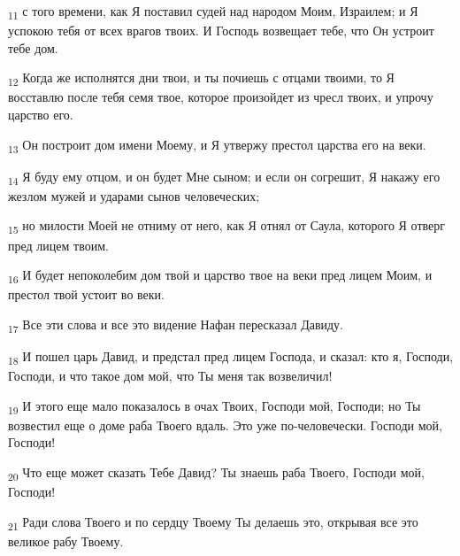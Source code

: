 \begin{tcolorbox}
\textsubscript{11} с того времени, как Я поставил судей над народом Моим, Израилем; и Я успокою тебя от всех врагов твоих. И Господь возвещает тебе, что Он устроит тебе дом.
\end{tcolorbox}
\begin{tcolorbox}
\textsubscript{12} Когда же исполнятся дни твои, и ты почиешь с отцами твоими, то Я восставлю после тебя семя твое, которое произойдет из чресл твоих, и упрочу царство его.
\end{tcolorbox}
\begin{tcolorbox}
\textsubscript{13} Он построит дом имени Моему, и Я утвержу престол царства его на веки.
\end{tcolorbox}
\begin{tcolorbox}
\textsubscript{14} Я буду ему отцом, и он будет Мне сыном; и если он согрешит, Я накажу его жезлом мужей и ударами сынов человеческих;
\end{tcolorbox}
\begin{tcolorbox}
\textsubscript{15} но милости Моей не отниму от него, как Я отнял от Саула, которого Я отверг пред лицем твоим.
\end{tcolorbox}
\begin{tcolorbox}
\textsubscript{16} И будет непоколебим дом твой и царство твое на веки пред лицем Моим, и престол твой устоит во веки.
\end{tcolorbox}
\begin{tcolorbox}
\textsubscript{17} Все эти слова и все это видение Нафан пересказал Давиду.
\end{tcolorbox}
\begin{tcolorbox}
\textsubscript{18} И пошел царь Давид, и предстал пред лицем Господа, и сказал: кто я, Господи, Господи, и что такое дом мой, что Ты меня так возвеличил!
\end{tcolorbox}
\begin{tcolorbox}
\textsubscript{19} И этого еще мало показалось в очах Твоих, Господи мой, Господи; но Ты возвестил еще о доме раба Твоего вдаль. Это уже по-человечески. Господи мой, Господи!
\end{tcolorbox}
\begin{tcolorbox}
\textsubscript{20} Что еще может сказать Тебе Давид? Ты знаешь раба Твоего, Господи мой, Господи!
\end{tcolorbox}
\begin{tcolorbox}
\textsubscript{21} Ради слова Твоего и по сердцу Твоему Ты делаешь это, открывая все это великое рабу Твоему.
\end{tcolorbox}
